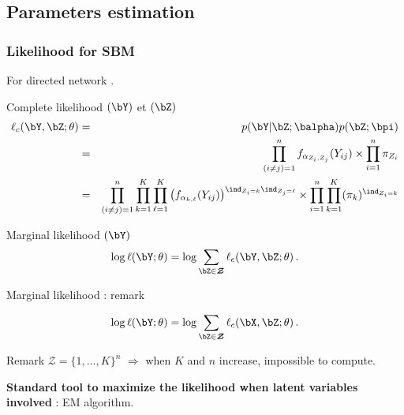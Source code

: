\documentclass[compress,10pt]{beamer}
\begin{document}
\subsection{Parameters estimation}

\begin{frame} \frametitle{Likelihood for SBM}
For directed network .

 \begin{block}{Complete  likelihood $(\bY)$  et  $(\bZ)$}
 \begin{eqnarray}\label{eq:lik}
\ell_c(\bY,\bZ; \theta) &=& p(\bY | \bZ; \balpha) p(\bZ ; \bpi)\nonumber  \\
&=& \prod_{(i \neq j) = 1}^n f_{\alpha_{Z_i,Z_j}}(Y_{ij}) \times   \prod_{i=1}^n  \pi_{Z_i} \nonumber  \\
&=& \prod_{(i \neq j) = 1}^n\prod_{k=1}^K \prod_{\ell=1} ^K \left(f_{\alpha_{k,\ell}}(Y_{ij})\right)^{\ind_{Z_i=k} \ind_{Z_j=\ell}} \times   \prod_{i=1}^n \prod_{k=1}^K   (\pi_{k})^{\ind_{Z_i=k}} \nonumber  
\end{eqnarray}
 
 \end{block}
 

\begin{block}{Marginal likelihood $(\bY)$}
\begin{equation}\label{eq:vraismarg}
\log \ell(\bY; \theta) =\log \sum_{\bZ \in \boldsymbol{\mathcal{Z}}} \ell_c(\bY,\bZ; \theta) \,.
\end{equation}
 \end{block}
 

 \end{frame}
 

 
\begin{frame}{Marginal likelihood  : remark }
 
 $$
\log \ell(\bY; \theta) =\log \sum_{\bZ \in \boldsymbol{\mathcal{Z}}} \ell_c(\bX,\bZ; \theta) \,.
$$
 
  \begin{block}{Remark}
$\boldsymbol{\mathcal{Z}} =   \{1,\dots, K\}^{n}$ \color{dgreen} $\Rightarrow$ \color{black}  when  $K$ and $n$ increase, impossible to compute. 
 \end{block}
 
\color{dgreen} \textbf{Standard tool to maximize the likelihood when latent variables involved} \color{black} : EM  algorithm.  
 
 \end{frame}
 
\end{document}
